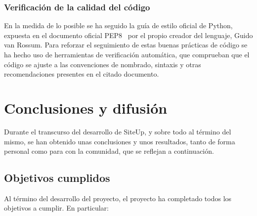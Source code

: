 \documentclass[a4paper,12pt]{article}
\begin{document}
\subsubsection{Verificación de la calidad del código}

En la medida de lo posible se ha seguido la guía de estilo oficial de Python,
expuesta en el documento oficial PEP8~\cite{pep8} por el propio creador del
lenguaje, Guido van Rossum. Para reforzar el seguimiento de estas buenas
prácticas de código se ha hecho uso de herramientas de verificación automática,
que comprueban que el código se ajuste a las convenciones de nombrado, sintaxis
y otras recomendaciones presentes en el citado documento.


\section{Conclusiones y difusión}

Durante el transcurso del desarrollo de SiteUp, y sobre todo al término del
mismo, se han obtenido unas conclusiones y unos resultados, tanto de forma
personal como para con la comunidad, que se reflejan a continuación.

\subsection{Objetivos cumplidos}
Al término del desarrollo del proyecto, el proyecto ha completado todos los
objetivos a cumplir. En particular:
\end{document}
